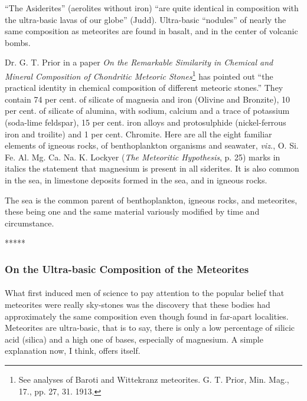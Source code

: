 \documentclass[a4paper, 12pt, oneside, landscape]{article}
\begin{document}
``The Asiderites'' (aerolites without iron) ``are quite identical in composition with the ultra-basic lavas of our globe'' (Judd). Ultra-basic ``nodules'' of nearly the same composition as meteorites are found in basalt, and in the center of volcanic bombs.

Dr. G. T. Prior in a paper \emph{On the Remarkable Similarity in Chemical and Mineral Composition of Chondritic Meteoric Stones}\footnote{See analyses of Baroti and Wittekranz meteorites. G. T. Prior, Min. Mag., 17., pp. 27, 31. 1913.} has pointed out ``the practical identity in chemical composition of different meteoric stones.'' They contain 74 per cent. of silicate of magnesia and iron (Olivine and Bronzite), 10 per cent. of silicate of alumina, with sodium, calcium and a trace of potassium (soda-lime feldspar), 15 per cent. iron alloys and protosulphide (nickel-ferrous iron and troilite) and 1 per cent. Chromite. Here are all the eight familiar elements of igneous rocks, of benthoplankton organisms and seawater, \emph{viz.}, O. Si. Fe. Al. Mg. Ca. Na. K. Lockyer (\emph{The Meteoritic Hypothesis}, p. 25) marks in italics the statement that magnesium is present in all siderites. It is also common in the sea, in limestone deposits formed in the sea, and in igneous rocks.

The sea is the common parent of benthoplankton, igneous rocks, and meteorites, these being one and the same material variously modified by time and circumstance.

\centerline{*\hspace{15mm}*\hspace{15mm}*\hspace{15mm}*\hspace{15mm}*}
\bigskip

\subsubsection{On the Ultra-basic Composition of the Meteorites}
\paragraph{}
What first induced men of science to pay attention to the popular belief that meteorites were really sky-stones was the discovery that these bodies had approximately the same composition even though found in far-apart localities. Meteorites are ultra-basic, that is to say, there is only a low percentage of silicic acid (silica) and a high one of bases, especially of magnesium. A simple explanation now, I think, offers itself.
\end{document}
